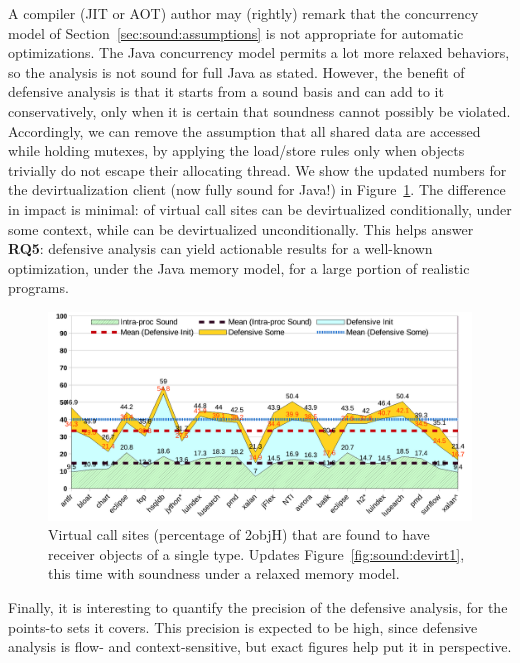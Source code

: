 A compiler (JIT or AOT) author may (rightly) remark that the concurrency model of Section~\ref{sec:sound:assumptions} is not appropriate for automatic optimizations. The Java concurrency model permits a lot more relaxed behaviors, so the analysis is not sound for full Java as stated. However, the benefit of defensive analysis is that it starts from a sound basis and can add to it conservatively, only when it is certain that soundness cannot possibly be violated. Accordingly, we can remove the assumption that all shared data are accessed while holding mutexes, by applying the load/store rules only when objects trivially do not escape their allocating thread. We show the updated numbers for the devirtualization client (now fully sound for Java!) in Figure~\ref{fig:sound:devirt2}. The difference in impact is minimal:  of virtual call sites can be devirtualized conditionally, under some context, while  can be devirtualized unconditionally. This helps answer \textbf{RQ5}: defensive analysis can yield actionable results for a well-known optimization, under the Java memory model, for a large portion of realistic programs.

\begin{figure}[tbh]
\centering
\includegraphics[width=\linewidth]{assets/defensive/devirt2.pdf}
\caption{Virtual call sites (percentage of 2objH) that are found to have receiver objects of a single type. Updates Figure~\ref{fig:sound:devirt1}, this time with soundness under a relaxed memory model.}
\label{fig:sound:devirt2}
\end{figure}


Finally, it is interesting to quantify the precision of the defensive analysis, for the points-to sets it covers. This precision is expected to be high, since defensive analysis is flow- and context-sensitive, but exact figures help put it in perspective.


